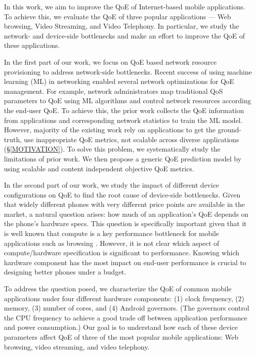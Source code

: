 In this work, we aim to improve the QoE of Internet-based mobile applications.
To achieve this, we evaluate the QoE of three popular applications --- Web browsing, Video Streaming, and Video Telephony. 
In particular, we study the network- and device-side bottlenecks and make an effort to improve the QoE of these applications.

In the first part of our work, we focus on QoE based network resource provisioning to address network-side bottlenecks.
Recent success of using machine learning (ML) in networking enabled several network optimizations for QoE management.
For example, network administrators map traditional QoS parameters to QoE using ML algorithms and control network resources according the end-user QoE. 
To achieve this, the prior work collects the QoE information from applications and corresponding network statistics to train the ML model. 
However, majority of the existing work rely on applications to get the ground-truth, use inappropriate QoE metrics, not scalable across diverse applications (\S\ref{MOTIVATION}).
To solve this problem, we systematically study the limitations of prior work. We then propose a generic QoE prediction model by using scalable and content independent objective QoE metrics.

In the second part of our work, we study the impact of different device configurations on QoE to find the root cause of device-side bottlenecks.
Given that widely different phones with very different price points are available in the market, a natural question arises: how much of an application's QoE depends on the phone's hardware specs.
This question is specifically important given that it is well known that compute is a key performance bottleneck for mobile applications such as browsing \cite{nejati2016depth}. However, it is not clear which aspect of compute/hardware specification is significant to performance. Knowing which hardware component has the most impact on end-user performance is crucial to designing better phones under a budget.

To address the question posed, we characterize the QoE of common mobile applications under four different hardware components: (1) clock frequency, (2) memory, (3) number of cores, and (4) Android governors. (The governors control the CPU frequency to achieve a good trade off between application performance and power consumption.) Our goal is to understand how each of these device parameters affect QoE of three of the most popular mobile applications: Web browsing, video streaming, and video telephony.

